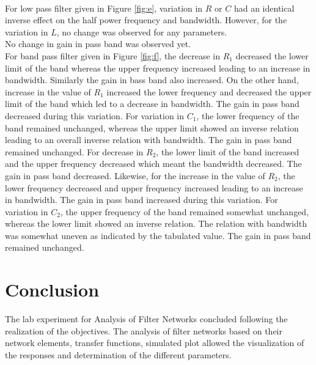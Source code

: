 \documentclass{lab_sheet}
\begin{document}
\\For low pass filter given in Figure \ref{fig:e}, variation in $R$ or $C$ had an identical inverse effect on the half power frequency and bandwidth. However, for the variation in $L$, no change was observed for any parameters.\\
No change in gain in pass band was observed yet.\\
For band pass filter given in Figure \ref{fig:f}, the decrease in $R_1$ decreased the lower limit of the band whereas the upper frequency increased leading to an increase in bandwidth. Similarly the gain in bass band also increased. On the other hand, increase in the value of $R_1$ increased the lower frequency and decreased the upper limit of the band which led to a decrease in bandwidth. The gain in pass band decreased during this variation. For variation in $C_1$, the lower frequency of the band remained unchanged, whereas the upper limit showed an inverse relation leading to an overall inverse relation with bandwidth. The gain in pass band remained unchanged. For decrease in $R_2$, the lower limit of the band increased and the upper frequency decreased which meant the bandwidth decreased. The gain in pass band decreased. Likewise, for the increase in the value of $R_2$, the lower frequency decreased and upper frequency increased leading to an increase in bandwidth. The gain in pass band increased during this variation. For variation in $C_2$, the upper frequency of the band remained somewhat unchanged, whereas the lower limit showed an inverse relation. The relation with bandwidth was somewhat uneven as indicated by the tabulated value. The gain in pass band remained unchanged.
\section{Conclusion}
The lab experiment for Analysis of Filter Networks concluded following the realization of the objectives. The analysis of filter networks based on their network elements, transfer functions, simulated plot allowed the visualization of the responses and determination of the different parameters.
\end{document}
